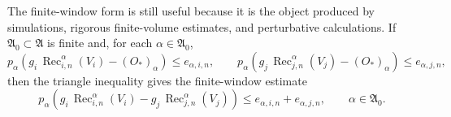 The finite-window form is still useful because it is the object produced by
simulations, rigorous finite-volume estimates, and perturbative
calculations.  If \(\mathfrak A_0\subset\mathfrak A\) is finite and, for
each \(\alpha\in\mathfrak A_0\),
\begin{equation}
  p_\alpha\!\left(
    g_i\,\operatorname{Rec}_{i,n}^{\alpha}(V_i)
    -
    (O_\ast)_\alpha
  \right)
  \leq e_{\alpha,i,n},
  \qquad
  p_\alpha\!\left(
    g_j\,\operatorname{Rec}_{j,n}^{\alpha}(V_j)
    -
    (O_\ast)_\alpha
  \right)
  \leq e_{\alpha,j,n},
\end{equation}
then the triangle inequality gives the finite-window estimate
\begin{equation}
  p_\alpha\!\left(
    g_i\,\operatorname{Rec}_{i,n}^{\alpha}(V_i)
    -
    g_j\,\operatorname{Rec}_{j,n}^{\alpha}(V_j)
  \right)
  \leq e_{\alpha,i,n}+e_{\alpha,j,n},
  \qquad \alpha\in\mathfrak A_0 .
  \label{eq:finite-window-universality-estimate}
\end{equation}

